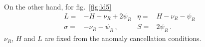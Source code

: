 \documentclass[12pt]{article}
\begin{document}
On the other hand, for fig.~\ref{fig:ld5}
\begin{align}
  L=&-H+\nu_R+2\psi_R &
  \eta=&H-\nu_R-\psi_R \nonumber\\
  \sigma=& -\nu_R-\psi_R\,,&S=& 2\psi_R \,.
\end{align}
$\nu_R$, $H$  and $L$ are fixed from the anomaly cancellation conditions.


%
%
%

%

\end{document}

